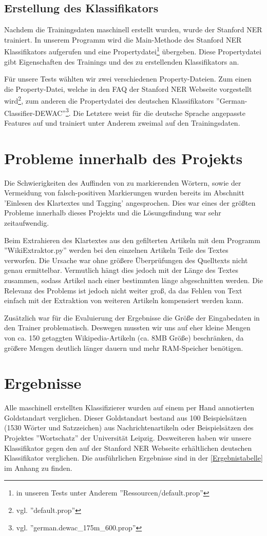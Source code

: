\documentclass[a4paper]{article}
\begin{document}
	\subsection{Erstellung des Klassifikators}
		Nachdem die Trainingsdaten maschinell erstellt wurden, wurde der Stanford NER trainiert.
		In unserem Programm wird die Main-Methode des Stanford NER Klassifikators aufgerufen und eine Propertydatei\footnote{in unseren Tests unter Anderem ''Ressourcen/default.prop''} übergeben.
		Diese Propertydatei gibt Eigenschaften des Trainings und des zu erstellenden Klassifikators an.

		Für unsere Tests wählten wir zwei verschiedenen Property-Dateien.
		Zum einen die Property-Datei, welche in den FAQ der Stanford NER Webseite vorgestellt wird\footnote{vgl. ''default.prop''}, zum anderen die Propertydatei des deutschen Klassifikators ''German-Classifier-DEWAC''\footnote{vgl. ''german.dewac\_175m\_600.prop''}.
		Die Letztere weist für die deutsche Sprache angepasste Features auf und trainiert unter Anderem zweimal auf den Trainingsdaten.

\section{Probleme innerhalb des Projekts}
\label{Probleme}
	Die Schwierigkeiten des Auffinden von zu markierenden Wörtern, sowie der Vermeidung von falsch-positiven Markierungen wurden bereits im Abschnitt 'Einlesen des Klartextes und Tagging' angesprochen. Dies war eines der größten Probleme innerhalb dieses Projekts und die Lösungsfindung war sehr zeitaufwendig.

	Beim Extrahieren des Klartextes aus den gefilterten Artikeln mit dem Programm ''WikiExtraktor.py'' werden bei den einzelnen Artikeln Teile des Textes verworfen.
	Die Ursache war ohne größere Überprüfungen des Quelltexts nicht genau ermittelbar. Vermutlich hängt dies jedoch mit der Länge des Textes zusammen, sodass Artikel nach einer bestimmten länge abgeschnitten werden. Die Relevanz des Problems ist jedoch nicht weiter groß, da das Fehlen von Text einfach mit der Extraktion von weiteren Artikeln kompensiert werden kann.
	
	Zusätzlich war für die Evaluierung der Ergebnisse die Größe der Eingabedaten in den Trainer problematisch. Deswegen mussten wir uns auf eher kleine Mengen von ca. 150 getaggten Wikipedia-Artikeln (ca. 8MB Größe) beschränken, da größere Mengen deutlich länger dauern und mehr RAM-Speicher benötigen.
\section{Ergebnisse}
	Alle maschinell erstellten Klassifizierer wurden auf einem per Hand annotierten Goldstandart verglichen.
	Dieser Goldstandart bestand aus 100 Beispielsätzen (1530 Wörter und Satzzeichen) aus Nachrichtenartikeln oder Beispielsätzen des Projektes ''Wortschatz'' der Universität Leipzig.
	Desweiteren haben wir unsere Klassifikator gegen den auf der Stanford NER Webseite erhältlichen deutschen Klassifikator verglichen.
	Die ausführlichen Ergebnisse sind in der \autoref{Ergebnistabelle} im Anhang zu finden.
\end{document}
